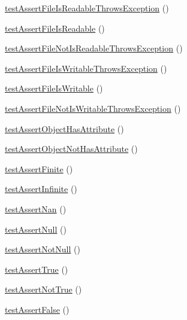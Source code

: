 \begin{DoxyCompactItemize}
\item 
\mbox{\hyperlink{class_framework___assert_test_af667d1b4c155aaf757ba3135912ec5da}{test\+Assert\+File\+Is\+Readable\+Throws\+Exception}} ()
\item 
\mbox{\hyperlink{class_framework___assert_test_a31b2b7f245839165db08ca9889e00f03}{test\+Assert\+File\+Is\+Readable}} ()
\item 
\mbox{\hyperlink{class_framework___assert_test_a96722351f92515b71f850cfd4b1eb1bc}{test\+Assert\+File\+Not\+Is\+Readable\+Throws\+Exception}} ()
\item 
\mbox{\hyperlink{class_framework___assert_test_a8f6a7260690ff35af92cd2aba11e607b}{test\+Assert\+File\+Is\+Writable\+Throws\+Exception}} ()
\item 
\mbox{\hyperlink{class_framework___assert_test_a5b8dc638d16a5b639adba19667f60680}{test\+Assert\+File\+Is\+Writable}} ()
\item 
\mbox{\hyperlink{class_framework___assert_test_a0365edf1603e6cef55737ad7ca2eda04}{test\+Assert\+File\+Not\+Is\+Writable\+Throws\+Exception}} ()
\item 
\mbox{\hyperlink{class_framework___assert_test_add59d5e39e76fd63898f4aafe4237e95}{test\+Assert\+Object\+Has\+Attribute}} ()
\item 
\mbox{\hyperlink{class_framework___assert_test_add5918412bda588dc9c8d6bc06fdcd80}{test\+Assert\+Object\+Not\+Has\+Attribute}} ()
\item 
\mbox{\hyperlink{class_framework___assert_test_a72e4c62df2429b38881fe1e0fb4d6eba}{test\+Assert\+Finite}} ()
\item 
\mbox{\hyperlink{class_framework___assert_test_aef2d474293462979d1f60a99ba384f69}{test\+Assert\+Infinite}} ()
\item 
\mbox{\hyperlink{class_framework___assert_test_a6b675e75e119ee7cc800dacc0a5bfb15}{test\+Assert\+Nan}} ()
\item 
\mbox{\hyperlink{class_framework___assert_test_a1b4798dd6a0472bcdfced2d30cfe1d35}{test\+Assert\+Null}} ()
\item 
\mbox{\hyperlink{class_framework___assert_test_a98f682be7a5045a155462cbf5870c14f}{test\+Assert\+Not\+Null}} ()
\item 
\mbox{\hyperlink{class_framework___assert_test_a5b89c575043eb9dbeefaac1a7c8401bc}{test\+Assert\+True}} ()
\item 
\mbox{\hyperlink{class_framework___assert_test_a57b9f3ecd6b234d86486794c308951c1}{test\+Assert\+Not\+True}} ()
\item 
\mbox{\hyperlink{class_framework___assert_test_a2a852b662f84c847ceb26c15d3067b4d}{test\+Assert\+False}} ()

\end{DoxyCompactItemize}
